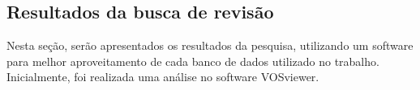 \subsection{Resultados da busca de revis\~ao}\label{subesec:resul da revisão}


%
%
%
%
%
%
%
%
%
%
%







Nesta seção, serão apresentados os resultados da pesquisa, utilizando um software para melhor aproveitamento de cada banco de dados utilizado no trabalho. Inicialmente, foi realizada uma análise no software VOSviewer.



